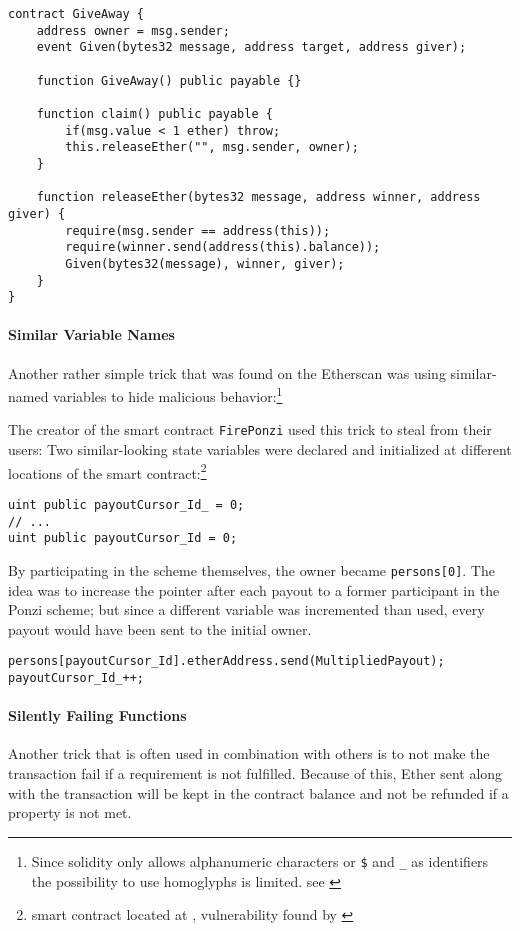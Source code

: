 \begin{verbatim}
contract GiveAway {
    address owner = msg.sender;
    event Given(bytes32 message, address target, address giver);
    
    function GiveAway() public payable {}

    function claim() public payable {
        if(msg.value < 1 ether) throw;
        this.releaseEther("", msg.sender, owner);
    }
    
    function releaseEther(bytes32 message, address winner, address giver) {
        require(msg.sender == address(this));
        require(winner.send(address(this).balance));
        Given(bytes32(message), winner, giver);
    }
}
\end{verbatim}

\paragraph{Similar Variable Names}
\label{section:honeypots:similar}
Another rather simple trick that was found on the Etherscan was using similar-named variables to hide malicious behavior:\footnote{Since solidity only allows alphanumeric characters or \texttt{\$} and \texttt{_} as identifiers the possibility to use homoglyphs is limited. see \cite[\texttt{docs/grammar.txt}]{ethereum:solidity}}

The creator of the smart contract \texttt{FirePonzi} used this trick to steal from their users: Two similar-looking state variables were declared and initialized at different locations of the smart contract:\footnote{smart contract located at \cite{etherscan:fireponzi}, vulnerability found by \cite{wagner:honeypots}}
\begin{verbatim}
uint public payoutCursor_Id_ = 0;
// ...
uint public payoutCursor_Id = 0;
\end{verbatim}

By participating in the scheme themselves, the owner became \texttt{persons[0]}. The idea was to increase the pointer after each payout to a former participant in the Ponzi scheme; but since a different variable was incremented than used, every payout would have been sent to the initial owner.
\begin{verbatim}
persons[payoutCursor_Id].etherAddress.send(MultipliedPayout);
payoutCursor_Id_++;
\end{verbatim}

\paragraph{Silently Failing Functions}
\label{section:honeypots:silentlyfailing}
Another trick that is often used in combination with others is to not make the transaction fail if a requirement is not fulfilled. Because of this, Ether sent along with the transaction will be kept in the contract balance and not be refunded if a property is not met.

